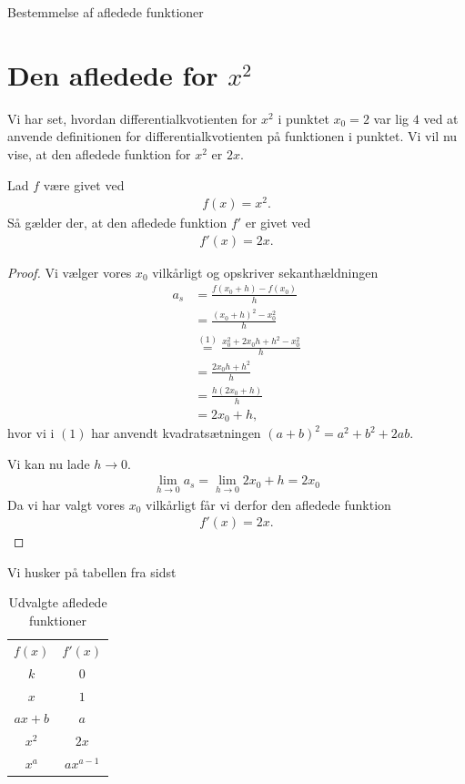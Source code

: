 \begin{center}
	\Huge
	Bestemmelse af afledede funktioner
\end{center}

\section*{Den afledede for $x^2$}

Vi har set, hvordan differentialkvotienten for $x^2$ i punktet $x_0 = 2$ var lig $4$ ved at anvende definitionen for differentialkvotienten på funktionen i punktet. Vi vil nu vise, at den afledede funktion 
for $x^2$ er $2x$.

\begin{setn}
	Lad $f$ være givet ved
	\begin{align*}
		f(x) = x^2.
	\end{align*}
	Så gælder der, at den afledede funktion $f'$ er givet ved
	\begin{align*}
		f'(x) = 2x.
	\end{align*}
\end{setn}
\begin{proof}
	Vi vælger vores $x_0$ vilkårligt og opskriver sekanthældningen
	\begin{align*}
		a_s &= \frac{f(x_0+h)-f(x_0)}{h}\\
		&= \frac{(x_0+h)^2-x_0^2}{h}\\
		&\stackrel{(1)}{=} \frac{x_0^2+2x_0h+h^2-x_0^2}{h}\\
		&=\frac{2x_0h+h^2}{h}\\
		&=\frac{h(2x_0+h)}{h}\\
		&=2x_0+h,
	\end{align*}
	hvor vi i $(1)$ har anvendt kvadratsætningen $(a+b)^2 = a^2+b^2+2ab$. 
	
	Vi kan nu lade $h \to 0$. 
	\begin{align*}
		\lim_{h\to 0}a_s = \lim_{h\to 0}2x_0+h = 2x_0
	\end{align*}
	Da vi har valgt vores $x_0$ vilkårligt får vi derfor den afledede funktion
	\begin{align*}
		f'(x) = 2x.
	\end{align*}
\end{proof}

Vi husker på tabellen fra sidst
\begin{table}[H]
	\centering
	\begin{tabular}{cc}
		$f(x)$ & $f'(x)$ \\
		$k$ & $0$ \\
		$x$ & $1$ \\
		$ax + b$  & $a$ \\
		$x^2$ & $2x$ \\
		$x^a$ & $ax^{a-1} $
	\end{tabular}
	\caption{Udvalgte afledede funktioner}
	\label{tab:afledt}
\end{table}

